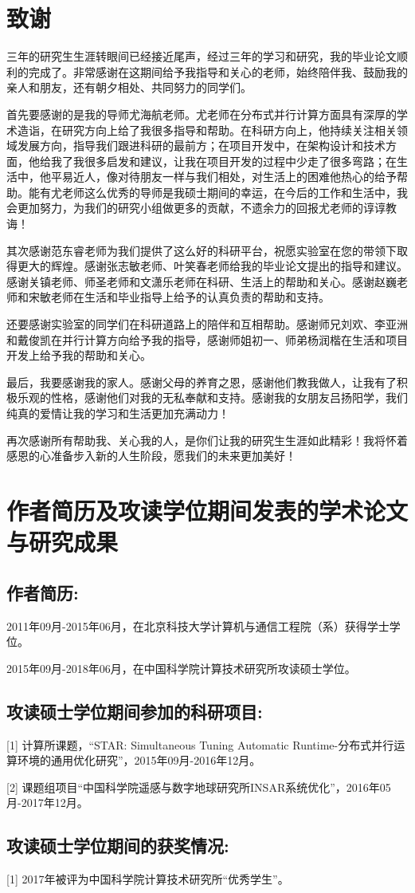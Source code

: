\chapter{致\quad 谢}	
	
三年的研究生生涯转眼间已经接近尾声，经过三年的学习和研究，我的毕业论文顺利的完成了。非常感谢在这期间给予我指导和关心的老师，始终陪伴我、鼓励我的亲人和朋友，还有朝夕相处、共同努力的同学们。	
	
首先要感谢的是我的导师尤海航老师。尤老师在分布式并行计算方面具有深厚的学术造诣，在研究方向上给了我很多指导和帮助。在科研方向上，他持续关注相关领域发展方向，指导我们跟进科研的最前方；在项目开发中，在架构设计和技术方面，他给我了我很多启发和建议，让我在项目开发的过程中少走了很多弯路；在生活中，他平易近人，像对待朋友一样与我们相处，对生活上的困难他热心的给予帮助。能有尤老师这么优秀的导师是我硕士期间的幸运，在今后的工作和生活中，我会更加努力，为我们的研究小组做更多的贡献，不遗余力的回报尤老师的谆谆教诲！	
	
其次感谢范东睿老师为我们提供了这么好的科研平台，祝愿实验室在您的带领下取得更大的辉煌。感谢张志敏老师、叶笑春老师给我的毕业论文提出的指导和建议。感谢关镇老师、师圣老师和文潇乐老师在科研、生活上的帮助和关心。感谢赵巍老师和宋敏老师在生活和毕业指导上给予的认真负责的帮助和支持。	
	
还要感谢实验室的同学们在科研道路上的陪伴和互相帮助。感谢师兄刘欢、李亚洲和戴俊凯在并行计算方向给予我的指导，感谢师姐初一、师弟杨润楷在生活和项目开发上给予我的帮助和关心。	
	
最后，我要感谢我的家人。感谢父母的养育之恩，感谢他们教我做人，让我有了积极乐观的性格，感谢他们对我的无私奉献和支持。感谢我的女朋友吕扬阳学，我们纯真的爱情让我的学习和生活更加充满动力！	
	
再次感谢所有帮助我、关心我的人，是你们让我的研究生生涯如此精彩！我将怀着感恩的心准备步入新的人生阶段，愿我们的未来更加美好！	
	
	
\chapter{作者简历及攻读学位期间发表的学术论文与研究成果}	
	
\section*{作者简历:}	
	
2011年09月-2015年06月，在北京科技大学计算机与通信工程院（系）获得学士学位。	
	
2015年09月-2018年06月，在中国科学院计算技术研究所攻读硕士学位。	
	
\section*{攻读硕士学位期间参加的科研项目:}	
	
[1] 计算所课题，“STAR: Simultaneous Tuning Automatic Runtime-分布式并行运算环境的通用优化研究”，2015年09月-2016年12月。	
	
[2] 课题组项目“中国科学院遥感与数字地球研究所INSAR系统优化”，2016年05月-2017年12月。	
	
\section*{攻读硕士学位期间的获奖情况:}	
	
[1] 2017年被评为中国科学院计算技术研究所“优秀学生”。	

